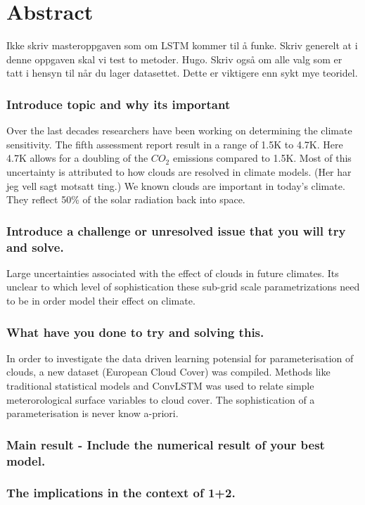 \chapter*{Abstract}
Ikke skriv masteroppgaven som om LSTM kommer til å funke. Skriv generelt at i denne oppgaven skal vi test to metoder. Hugo. 
Skriv også om alle valg som er tatt i hensyn til når du lager datasettet. Dette er viktigere enn sykt mye teoridel. 


\subsection*{Introduce topic and why its important}
Over the last decades researchers have been working on determining the climate sensitivity. The fifth assessment report result in a range of 1.5K to 4.7K. Here 4.7K allows for a doubling of the $CO_2$ emissions compared to 1.5K. Most of this uncertainty is attributed to how clouds are resolved in climate models. (Her har jeg vell sagt motsatt ting.) We known clouds are important in today's climate. They reflect 50\% of the solar radiation back into space. %

\subsection*{Introduce a challenge or unresolved issue that you will try and solve.} 
Large uncertainties associated with the effect of clouds in future climates. Its unclear to which level of sophistication these sub-grid scale parametrizations need to be in order model their effect on climate.

\subsection*{What have you done to try and solving this.}
In order to investigate the data driven learning potensial for parameterisation of clouds, a new dataset (European Cloud Cover) was compiled. Methods like traditional statistical models and ConvLSTM was used to relate simple meterorological surface variables to cloud cover. The sophistication of a parameterisation is never know a-priori.

\subsection*{Main result - Include the numerical result of your best model.}

\subsection*{The implications in the context of 1+2.}
\cleardoublepage